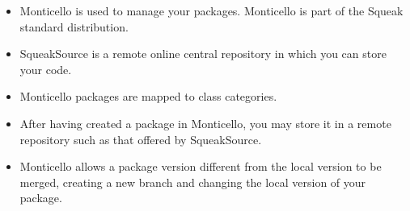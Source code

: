 \documentclass[a4paper,10pt,twoside]{book}
\begin{document}
\begin{itemize}
\item Monticello is used to manage your packages. Monticello is part of the Squeak standard distribution.

\item SqueakSource is a remote online central repository in which you can store your code.

\item Monticello packages are mapped to class categories. 

\item After having created a package in Monticello, you may store it in a remote repository such as that offered by SqueakSource.

\item Monticello allows a package version different from the local version to be merged, creating a new branch and changing the local version of your package.
\end{itemize}




\end{document}
